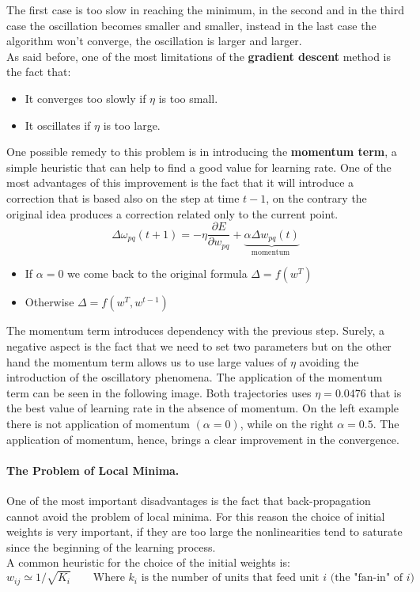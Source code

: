 The first case is too slow in reaching the minimum, in the second and in the third case the oscillation becomes smaller and smaller, instead in the last case the algorithm won't converge, the oscillation is larger and larger.\\
As said before, one of the most limitations of the \textbf{gradient descent} method is the fact that:
\begin{itemize}
	\item It converges too slowly if $\eta$ is too small.
	\item It oscillates if $\eta$ is too large.
\end{itemize}
One possible remedy to this problem is in introducing the \textbf{momentum term}, a simple heuristic that can help to find a good value for learning rate. One of the most advantages of this improvement is the fact that it will introduce a correction that is based also on the step at time $t-1$, on the contrary the original idea produces a correction related only to the current point.
$$\Delta \omega_{pq}(t+1) = -\eta \frac{\partial E}{\partial w_{pq}}+\underbrace{\alpha \Delta w_{pq} (t)}_{\text{momentum }}$$

\begin{itemize}
	\item If $\alpha = 0$ we come back to the original formula $\Delta = f(w^T)$
	\item Otherwise $\Delta = f(w^T, w^{t-1})$
\end{itemize}
The momentum term introduces dependency with the previous step. Surely, a negative aspect is the fact that we need to set two parameters but on the other hand the momentum term allows us to use large values of $\eta$ avoiding the introduction of the oscillatory phenomena. The application of the momentum term can be seen in the following image.
Both trajectories uses $\eta=0.0476$ that is the best value of learning rate in the absence of momentum. On the left example there is not application of momentum $(\alpha=0)$, while on the right $\alpha=0.5$. The application of momentum, hence, brings a clear improvement in the convergence.

\paragraph*{The Problem of Local Minima.} One of the most important disadvantages is the fact that back-propagation cannot avoid the problem of local minima. For this reason the choice of initial weights is very important, if they are too large the nonlinearities tend to saturate since the beginning of the learning process. \\
A common heuristic for the choice of the initial weights is: 
$$w_{ij} \simeq 1/\sqrt{K_i} \qquad \text{Where } k_i \text{ is the number of units that feed unit }i \text{ (the "fan-in" of }i \text{)}$$

